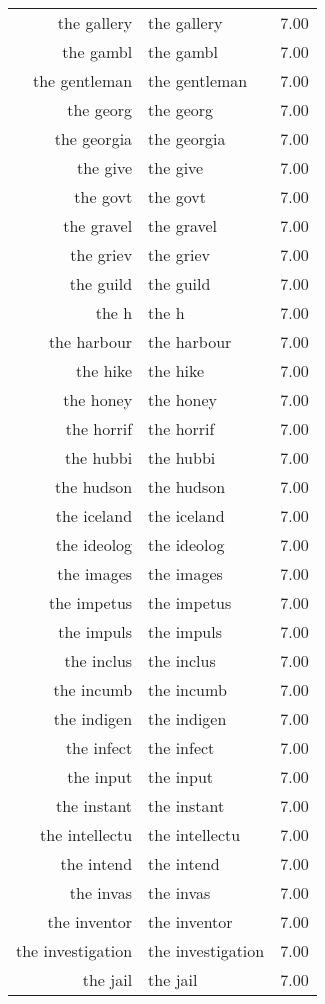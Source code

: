 \begin{table}[ht]
\begin{tabular}{rlr}
  the gallery & the gallery & 7.00 \\ 
  the gambl & the gambl & 7.00 \\ 
  the gentleman & the gentleman & 7.00 \\ 
  the georg & the georg & 7.00 \\ 
  the georgia & the georgia & 7.00 \\ 
  the give & the give & 7.00 \\ 
  the govt & the govt & 7.00 \\ 
  the gravel & the gravel & 7.00 \\ 
  the griev & the griev & 7.00 \\ 
  the guild & the guild & 7.00 \\ 
  the h & the h & 7.00 \\ 
  the harbour & the harbour & 7.00 \\ 
  the hike & the hike & 7.00 \\ 
  the honey & the honey & 7.00 \\ 
  the horrif & the horrif & 7.00 \\ 
  the hubbi & the hubbi & 7.00 \\ 
  the hudson & the hudson & 7.00 \\ 
  the iceland & the iceland & 7.00 \\ 
  the ideolog & the ideolog & 7.00 \\ 
  the images & the images & 7.00 \\ 
  the impetus & the impetus & 7.00 \\ 
  the impuls & the impuls & 7.00 \\ 
  the inclus & the inclus & 7.00 \\ 
  the incumb & the incumb & 7.00 \\ 
  the indigen & the indigen & 7.00 \\ 
  the infect & the infect & 7.00 \\ 
  the input & the input & 7.00 \\ 
  the instant & the instant & 7.00 \\ 
  the intellectu & the intellectu & 7.00 \\ 
  the intend & the intend & 7.00 \\ 
  the invas & the invas & 7.00 \\ 
  the inventor & the inventor & 7.00 \\ 
  the investigation & the investigation & 7.00 \\ 
  the jail & the jail & 7.00 \\ 

\end{tabular}
\end{table}
